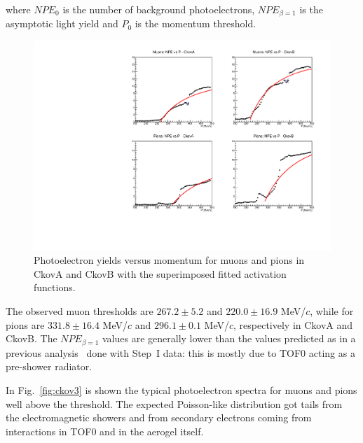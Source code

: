 where $NPE_0$ is the number of background photoelectrons, $NPE_{\beta=1}$ is the asymptotic light yield and $P_0$ is the momentum threshold.

\begin{figure}[htb!]
  \begin{center}
    \includegraphics[width=0.85\columnwidth]{./03-Ckov/Figures/Ckov_photoelectrons_vs_P.pdf}
    \caption{Photoelectron yields versus momentum for muons and pions in CkovA and CkovB with the superimposed fitted activation functions.}
    \label{fig:ckov2}
  \end{center}
\end{figure}

The observed muon thresholds are $267.2\pm5.2$ and $220.0\pm16.9$ MeV/$c$, while for pions are $331.8\pm16.4$ MeV/$c$ and $296.1\pm0.1$ MeV/$c$, respectively in CkovA and CkovB. The $NPE_{\beta=1}$ values are generally lower than the values predicted as in a previous analysis~\cite{NOTE473} done with Step~I data: this is mostly due to TOF0 acting as a pre-shower radiator.

In Fig.~\ref{fig:ckov3} is shown the typical photoelectron spectra for muons and pions well above the threshold. The expected Poisson-like distribution got tails from the electromagnetic showers and from secondary electrons coming from interactions in TOF0 and in the aerogel itself.

